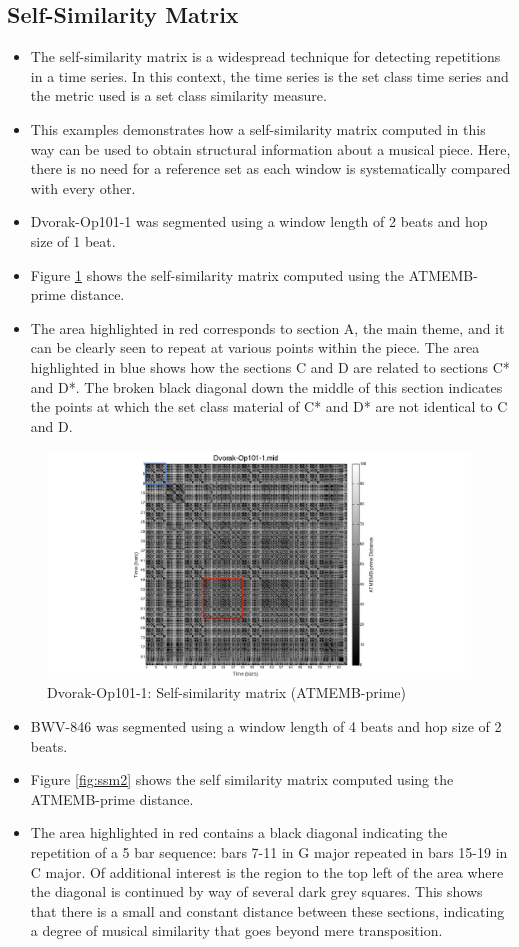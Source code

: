 \documentclass{article}
\begin{document}
\subsection{Self-Similarity Matrix}
\label{sec-8-5}

\begin{itemize}
\item The self-similarity matrix is a widespread technique for detecting
  repetitions in a time series. In this context, the time series is
  the set class time series and the metric used is a set class
  similarity measure.
\item This examples demonstrates how a self-similarity matrix computed in
  this way can be used to obtain structural information about a
  musical piece. Here, there is no need for a reference set as each
  window is systematically compared with every other.
\item Dvorak-Op101-1 was segmented using a window length of 2 beats and
  hop size of 1 beat.
\item Figure \ref{fig:ssm1} shows the self-similarity matrix computed
  using the ATMEMB-prime distance.
\item The area highlighted in red corresponds to section A, the main
  theme, and it can be clearly seen to repeat at various points within
  the piece. The area highlighted in blue shows how the sections C and
  D are related to sections C* and D*. The broken black diagonal down
  the middle of this section indicates the points at which the set
  class material of C* and D* are not identical to C and D.
\end{itemize}
\begin{figure}[htb]
\centering
\includegraphics[width=.8\linewidth]{./plots/ssm1a.png}
\caption{\label{fig:ssm1}Dvorak-Op101-1: Self-similarity matrix (ATMEMB-prime)}
\end{figure}
\begin{itemize}
\item BWV-846 was segmented using a window length of 4 beats and hop size
  of 2 beats.
\item Figure \ref{fig:ssm2} shows the self similarity matrix computed
  using the ATMEMB-prime distance.
\item The area highlighted in red contains a black diagonal indicating the
  repetition of a 5 bar sequence: bars 7-11 in G major repeated in
  bars 15-19 in C major. Of additional interest is the region to the
  top left of the area where the diagonal is continued by way of
  several dark grey squares. This shows that there is a small and
  constant distance between these sections, indicating a degree of
  musical similarity that goes beyond mere transposition.
\end{itemize}
\end{document}

